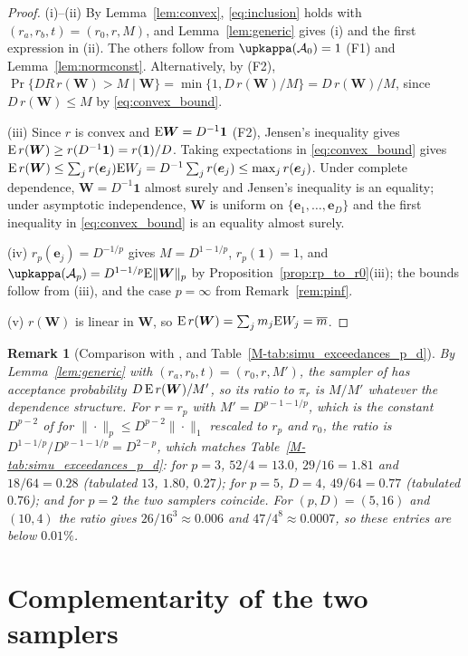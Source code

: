 \documentclass[12pt]{article}
\newtheorem{remark}{Remark}
\newcommand{\bW}{\bm W}
\newcommand{\one}{\bm 1}
\begin{document}
\begin{proof}
(i)--(ii) By Lemma~\ref{lem:convex}, \eqref{eq:inclusion} holds with $(r_a,r_b,t)=(r_0,r,M)$, and Lemma~\ref{lem:generic} gives (i) and the first expression in (ii). The others follow from $\upkappa(\calA_0)=1$ (F1) and Lemma~\ref{lem:normconst}. Alternatively, by (F2), $\Pr\{DR\,r(\bW)>M\mid\bW\}=\min\{1,D\,r(\bW)/M\}=D\,r(\bW)/M$, since $D\,r(\bW)\leq M$ by \eqref{eq:convex_bound}.

(iii) Since $r$ is convex and $\E\bW=D^{-1}\one$ (F2), Jensen's inequality gives $\E\,r(\bW)\geq r(D^{-1}\one)=r(\one)/D$. Taking expectations in \eqref{eq:convex_bound} gives $\E\,r(\bW)\leq\sum_jr(\bm e_j)\E W_j=D^{-1}\sum_jr(\bm e_j)\leq\max_jr(\bm e_j)$. Under complete dependence, $\bW=D^{-1}\one$ almost surely and Jensen's inequality is an equality; under asymptotic independence, $\bW$ is uniform on $\{\bm e_1,\dots,\bm e_D\}$ and the first inequality in \eqref{eq:convex_bound} is an equality almost surely.

(iv) $r_p(\bm e_j)=D^{-1/p}$ gives $M=D^{1-1/p}$, $r_p(\one)=1$, and $\upkappa(\calA_p)=D^{1-1/p}\E\|\bW\|_p$ by Proposition~\ref{prop:rp_to_r0}(iii); the bounds follow from (iii), and the case $p=\infty$ from Remark~\ref{rem:pinf}.

(v) $r(\bW)$ is linear in $\bW$, so $\E\,r(\bW)=\sum_jm_j\E W_j=\bar m$.
\end{proof}

\begin{remark}[Comparison with \citealp{Dombry.etal:2024}, and Table~\ref{M-tab:simu_exceedances_p_d}]
By Lemma~\ref{lem:generic} with $(r_a,r_b,t)=(r_0,r,M')$, the sampler of \citet[Proposition~2]{Dombry.etal:2024} has acceptance probability $D\,\E\,r(\bW)/M'$, so its ratio to $\pi_r$ is $M/M'$ whatever the dependence structure. For $r=r_p$ with $M'=D^{p-1-1/p}$, which is the constant $D^{p-2}$ of \citet{Dombry.etal:2024} for $\|\cdot\|_p\leq D^{p-2}\|\cdot\|_1$ rescaled to $r_p$ and $r_0$, the ratio is $D^{1-1/p}/D^{p-1-1/p}=D^{2-p}$, which matches Table~\ref{M-tab:simu_exceedances_p_d}: for $p=3$, $52/4=13.0$, $29/16=1.81$ and $18/64=0.28$ (tabulated $13$, $1.80$, $0.27$); for $p=5$, $D=4$, $49/64=0.77$ (tabulated $0.76$); and for $p=2$ the two samplers coincide. For $(p,D)=(5,16)$ and $(10,4)$ the ratio gives $26/16^3\approx0.006$ and $47/4^8\approx0.0007$, so these entries are below $0.01\%$.
\end{remark}

\section{Complementarity of the two samplers}
\end{document}
